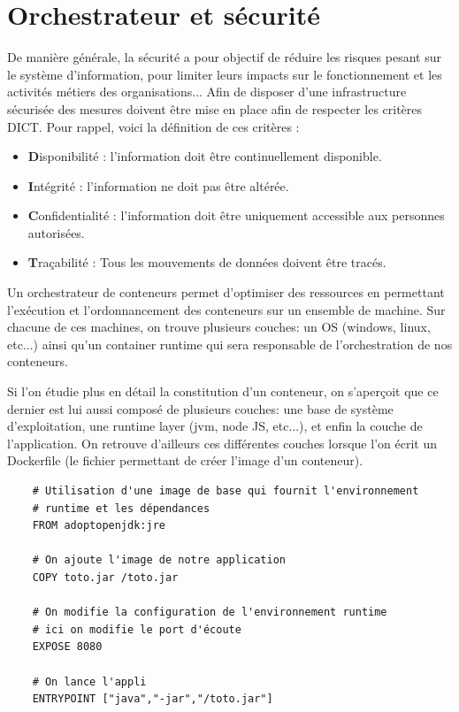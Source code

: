 \documentclass[11pt,fleqn]{book} %
\begin{document}
\chapter{Orchestrateur et sécurité} 
\label{securite}
\vspace{-2cm}
De manière générale, la sécurité  a  pour  objectif  de réduire  les  risques pesant  sur  le  système    d’information,    pour limiter    leurs    impacts sur    le  fonctionnement et les activités métiers des organisations... Afin de disposer d’une infrastructure sécurisée des mesures doivent être mise en place afin de respecter les critères DICT. Pour rappel, voici la définition de ces critères :
\begin{itemize}
    \item \textbf{D}isponibilité : l’information doit être continuellement disponible.
    \item \textbf{I}ntégrité : l’information ne doit pas être altérée.
    \item \textbf{C}onfidentialité : l’information doit être uniquement accessible aux personnes autorisées.
    \item \textbf{T}raçabilité : Tous les mouvements de données doivent être tracés.\newline
\end{itemize}

Un orchestrateur de conteneurs permet d'optimiser des ressources en permettant l'exécution et l'ordonnancement des conteneurs sur un ensemble de machine. Sur chacune de ces machines, on trouve plusieurs couches: un OS (windows, linux, etc...) ainsi qu'un container runtime qui sera responsable de l'orchestration de nos conteneurs.\newline

Si l'on étudie plus en détail la constitution d'un conteneur, on s'aperçoit que ce dernier est lui aussi composé de plusieurs couches: une base de système d'exploitation, une runtime layer (jvm, node JS, etc...), et enfin la couche de l'application.  On retrouve d'ailleurs ces différentes couches lorsque l'on écrit un Dockerfile (le fichier permettant de créer l'image d'un conteneur).
\begin{verbatim}
    # Utilisation d'une image de base qui fournit l'environnement
    # runtime et les dépendances
    FROM adoptopenjdk:jre
    
    # On ajoute l'image de notre application
    COPY toto.jar /toto.jar
    
    # On modifie la configuration de l'environnement runtime 
    # ici on modifie le port d'écoute
    EXPOSE 8080
    
    # On lance l'appli
    ENTRYPOINT ["java","-jar","/toto.jar"]
\end{verbatim}
\end{document}
